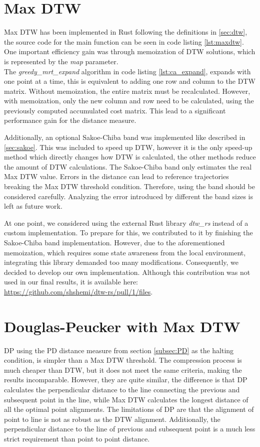 \section{Max DTW}
\label{sec:dtw_impl}
Max DTW has been implemented in Rust following the definitions in \ref{sec:dtw}, the source code for the main function can be seen in code listing \ref{lst:maxdtw}. One important efficiency gain was through memoization of DTW solutions, which is represented by the \textit{map} parameter. \\ The \textit{greedy\_mrt\_expand} algorithm in code listing \ref{lst:ca_expand}, expands with one point at a time, this is equivalent to adding one row and column to the DTW matrix. Without memoization, the entire matrix must be recalculated. However, with memoization, only the new column and row need to be calculated, using the previously computed accumulated cost matrix. This lead to a significant performance gain for the distance measure.

Additionally, an optional Sakoe-Chiba band was implemented like described in \ref{sec:sakoe}. This was included to speed up DTW, however it is the only speed-up method which directly changes how DTW is calculated, the other methods reduce the amount of DTW calculations. The Sakoe-Chiba band only estimates the real Max DTW value. Errors in the distance can lead to reference trajectories breaking the Max DTW threshold condition. Therefore, using the band should be considered carefully. Analyzing the error introduced by different the band sizes is left as future work.



At one point, we considered using the external Rust library \textit{dtw\_rs} instead of a custom implementation. To prepare for this, we contributed to it by finishing the Sakoe-Chiba band implementation. However, due to the aforementioned memoization, which requires some state awareness from the local environment, integrating this library demanded too many modifications. Consequently, we decided to develop our own implementation. Although this contribution was not used in our final results, it is available here: \\ \href{https://github.com/shshemi/dtw-rs/pull/1/files}{https://github.com/shshemi/dtw-rs/pull/1/files}.

\section{Douglas-Peucker with Max DTW}
DP using the PD distance measure from section \ref{subsec:PD} as the halting condition, is simpler than a Max DTW threshold. The compression process is much cheaper than DTW, but it does not meet the same criteria, making the results incomparable. However, they are quite similar, the difference is that DP calculates the perpendicular distance to the line connecting the previous and subsequent point in the line, while Max DTW calculates the longest distance of all the optimal point alignments. The limitations of DP are that the alignment of point to line is not as robust as the DTW alignment. Additionally, the perpendicular distance to the line of previous and subsequent point is a much less strict requirement than point to point distance.

